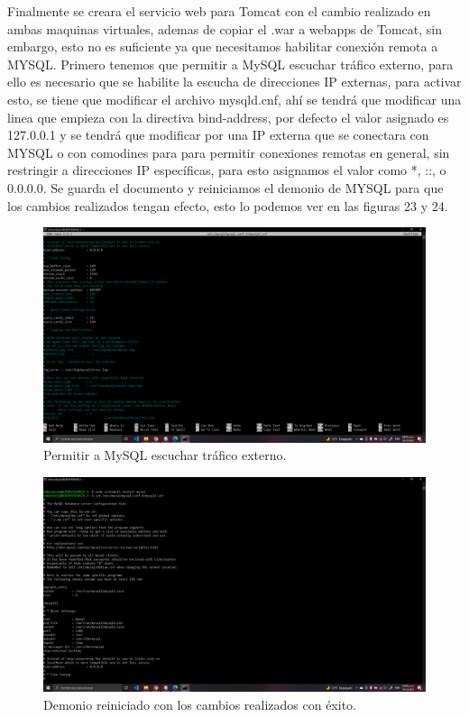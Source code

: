 \documentclass[11pt]{article}
\begin{document}
		Finalmente se creara el servicio web para Tomcat con el cambio realizado en ambas maquinas virtuales, ademas de copiar el .war a webapps de Tomcat, sin embargo, esto no es suficiente ya que necesitamos habilitar conexión remota a MYSQL. Primero tenemos que permitir a MySQL escuchar tráfico externo, para ello es necesario que se habilite la escucha de direcciones IP externas, para activar esto, se tiene que modificar el archivo mysqld.cnf, ahí se tendrá que modificar una linea que empieza con la directiva bind-address, por defecto el valor asignado es 127.0.0.1 y se tendrá que modificar por una IP externa que se conectara con MYSQL o con comodines para para permitir conexiones remotas en general, sin restringir a direcciones IP específicas, para esto asignamos el valor como *, ::, o 0.0.0.0. Se guarda el documento y reiniciamos el demonio de MYSQL para que los cambios realizados tengan efecto, esto lo podemos ver en las figuras 23 y 24.
		\begin{figure}[H]
			\centering
			\includegraphics[scale=0.34]{resources/conexionesremotasMYSQL.png}
			\caption{Permitir a MySQL escuchar tráfico externo.}\label{fig:picture}
		\end{figure}
		\begin{figure}[H]
			\centering
			\includegraphics[scale=0.34]{resources/conexionesremotasMYSQ1.png}
			\caption{Demonio reiniciado con los cambios realizados con éxito.}\label{fig:picture}
		\end{figure}
\end{document}
